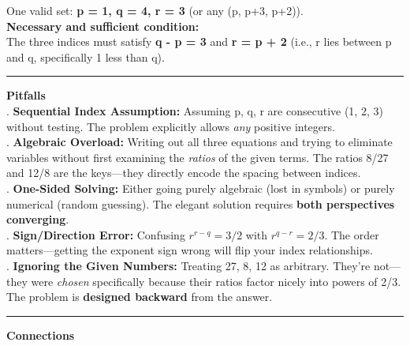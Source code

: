 \documentclass{article}
\begin{document}
\noindent One valid set: \textbf{p = 1, q = 4, r = 3} (or any (p, p+3, p+2)). \\

\noindent \textbf{Necessary and sufficient condition:} \\
\noindent The three indices must satisfy \textbf{q - p = 3} and \textbf{r = p + 2} (i.e., r lies between p and q, specifically 1 less than q). \\

\noindent \rule{\textwidth}{0.4pt}

\noindent \textbf{Pitfalls} \\

. \textbf{Sequential Index Assumption:} Assuming p, q, r are consecutive (1, 2, 3) without testing. The problem explicitly allows \textit{any} positive integers. \\

. \textbf{Algebraic Overload:} Writing out all three equations and trying to eliminate variables without first examining the \textit{ratios} of the given terms. The ratios 8/27 and 12/8 are the keys—they directly encode the spacing between indices. \\

. \textbf{One-Sided Solving:} Either going purely algebraic (lost in symbols) or purely numerical (random guessing). The elegant solution requires \textbf{both perspectives converging}. \\

. \textbf{Sign/Direction Error:} Confusing $r^{r-q} = 3/2$ with $r^{q-r} = 2/3$. The order matters—getting the exponent sign wrong will flip your index relationships. \\

. \textbf{Ignoring the Given Numbers:} Treating 27, 8, 12 as arbitrary. They're not—they were \textit{chosen} specifically because their ratios factor nicely into powers of 2/3. The problem is \textbf{designed backward} from the answer. \\

\noindent \rule{\textwidth}{0.4pt}

\noindent \textbf{Connections} \\
\end{document}
